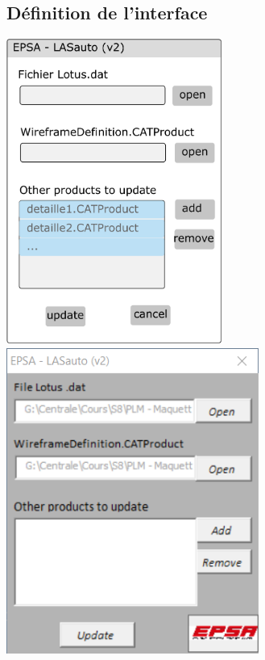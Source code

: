 \subsection{Définition de l'interface} %
\begin{minipage}{\textwidth}
    \centering \vspace{1em}
    \includegraphics[height=10cm]{img/interfaceGraphique.pdf}
    \includegraphics[height=10cm]{img/interface.png}
    \label{fig:interfaceGraphique}
\end{minipage}

